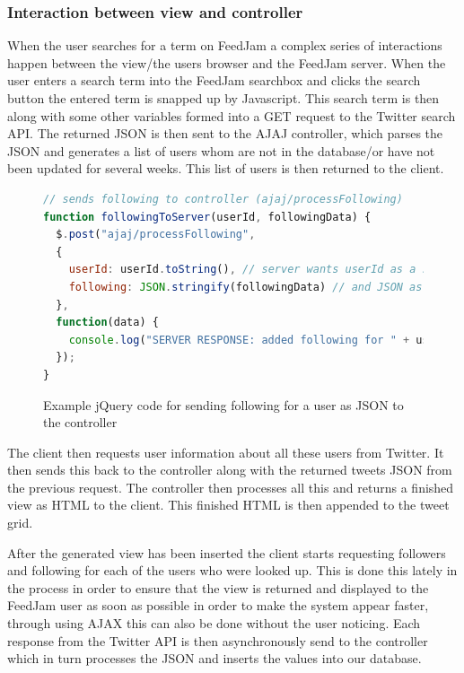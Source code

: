 \subsubsection{Interaction between view and controller} %
\label{viewControllerInteraction}
When the user searches for a term on FeedJam a complex series of interactions happen between the view/the users browser and the FeedJam server. When the user enters a search term into the FeedJam searchbox and clicks the search button the entered term is snapped up by Javascript. This search term is then along with some other variables formed into a GET request to the Twitter search API. The returned JSON is then sent to the AJAJ controller, which parses the JSON and generates a list of users whom are not in the database/or have not been updated for several weeks. This list of users is then returned to the client.

\begin{figure}[h!]
\begin{lstlisting}[language=javascript]
// sends following to controller (ajaj/processFollowing)
function followingToServer(userId, followingData) {
  $.post("ajaj/processFollowing", 
  { 
    userId: userId.toString(), // server wants userId as a string
    following: JSON.stringify(followingData) // and JSON as a string
  },
  function(data) {
    console.log("SERVER RESPONSE: added following for " + userId);
  });
}
\end{lstlisting}
\caption{Example jQuery code for sending following for a user as JSON to the controller}
\label{ajaxRequest}
\end{figure}

The client then requests user information about all these users from Twitter. It then sends this back to the controller along with the returned tweets JSON from the previous request. The controller then processes all this and returns a finished view as HTML to the client. This finished HTML is then appended to the tweet grid.

After the generated view has been inserted the client starts requesting followers and following for each of the users who were looked up. This is done this lately in the process in order to ensure that the view is returned and displayed to the FeedJam user as soon as possible in order to make the system appear faster, through using AJAX this can also be done without the user noticing. Each response from the Twitter API is then asynchronously send to the controller which in turn processes the JSON and inserts the values into our database.

